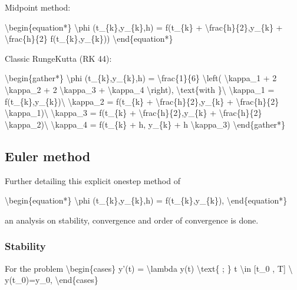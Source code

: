 \documentclass[letterpaper,10pt,english]{jupyterBook}
\begin{document}
\sphinxAtStartPar
Midpoint method:

\sphinxAtStartPar
\textbackslash{}begin\{equation*\}
\textbackslash{}phi (t\_\{k\},y\_\{k\},h) = f(t\_\{k\} + \textbackslash{}frac\{h\}\{2\},y\_\{k\} + \textbackslash{}frac\{h\}\{2\} f(t\_\{k\},y\_\{k\}))
\textbackslash{}end\{equation*\}

\sphinxAtStartPar
Classic Runge\sphinxhyphen{}Kutta (RK 4\sphinxhyphen{}4):

\sphinxAtStartPar
\textbackslash{}begin\{gather*\}
\textbackslash{}phi (t\_\{k\},y\_\{k\},h) = \textbackslash{}frac\{1\}\{6\} \textbackslash{}left( \textbackslash{}kappa\_1 + 2 \textbackslash{}kappa\_2 + 2 \textbackslash{}kappa\_3 + \textbackslash{}kappa\_4 \textbackslash{}right), \textbackslash{}text\{with \}\textbackslash{}
\textbackslash{}kappa\_1 = f(t\_\{k\},y\_\{k\})\textbackslash{}
\textbackslash{}kappa\_2 = f(t\_\{k\} + \textbackslash{}frac\{h\}\{2\},y\_\{k\} + \textbackslash{}frac\{h\}\{2\} \textbackslash{}kappa\_1)\textbackslash{}
\textbackslash{}kappa\_3 = f(t\_\{k\} + \textbackslash{}frac\{h\}\{2\},y\_\{k\} + \textbackslash{}frac\{h\}\{2\} \textbackslash{}kappa\_2)\textbackslash{}
\textbackslash{}kappa\_4 = f(t\_\{k\} + h, y\_\{k\} + h \textbackslash{}kappa\_3)
\textbackslash{}end\{gather*\}


\subsection{Euler method}
\label{\detokenize{cap2:euler-method}}
\sphinxAtStartPar
Further detailing this explicit one\sphinxhyphen{}step method of

\sphinxAtStartPar
\textbackslash{}begin\{equation*\}
\textbackslash{}phi (t\_\{k\},y\_\{k\},h) = f(t\_\{k\},y\_\{k\}),
\textbackslash{}end\{equation*\}

\sphinxAtStartPar
an analysis on stability, convergence and order of convergence is done.


\subsubsection{Stability}
\label{\detokenize{cap2:stability}}
\sphinxAtStartPar
For the problem
\textbackslash{}begin\{cases\}
y’(t) = \sphinxhyphen{} \textbackslash{}lambda y(t) \textbackslash{}text\{ ; \} t \textbackslash{}in {[}t\_0 , T{]} \textbackslash{}
y(t\_0)=y\_0,
\textbackslash{}end\{cases\}
\end{document}

